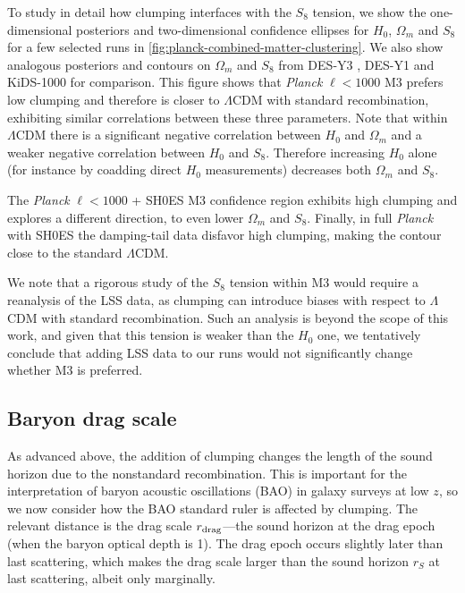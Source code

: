 To study in detail how clumping interfaces with the $S_8$ tension, we show the one-dimensional posteriors and two-dimensional confidence ellipses for $H_0$, $\Omega_m$ and $S_8$ for a few selected runs in \cref{fig:planck-combined-matter-clustering}.
We also show analogous posteriors and contours on $\Omega_m$ and $S_8$ from DES-Y3 \citep{DES-Y3}, DES-Y1 \citep{DES-Y1} and KiDS-1000 \citep{KiDS-1000} for comparison.
This figure shows that {\it Planck} $\ell<1000$ M3 prefers low clumping and therefore is closer to $\Lambda$CDM with standard recombination, exhibiting similar correlations between these three parameters.
Note that within $\Lambda$CDM there is a significant negative correlation between $H_0$ and $\Omega_m$ and a weaker negative correlation between $H_0$ and $S_8$.
Therefore increasing $H_0$ alone (for instance by coadding direct $H_0$ measurements) decreases both $\Omega_m$ and $S_8$.

The {\it Planck} $\ell<1000$ + SH0ES M3 confidence region exhibits high clumping and explores a different direction, to even lower $\Omega_m$ and $S_8$.
Finally, in full {\it Planck} with SH0ES the damping-tail data disfavor high clumping, making the contour close to the standard $\Lambda$CDM.

We note that a rigorous study of the $S_8$ tension within M3 would require a reanalysis of the LSS data, as clumping can introduce biases with respect to $\Lambda$CDM with standard recombination.
Such an analysis is beyond the scope of this work, and given that this tension is weaker than the $H_0$ one, we tentatively conclude that adding LSS data to our runs would not significantly change whether M3 is preferred.

\subsection{Baryon drag scale}

As advanced above, the addition of clumping changes the length of the sound horizon due to the nonstandard recombination.
This is important for the interpretation of baryon acoustic oscillations (BAO) in galaxy surveys at low $z$, so we now consider how the BAO standard ruler is affected by clumping.
The relevant distance is the drag scale $r_{\rm drag}$---the sound horizon at the drag epoch (when the baryon optical depth is 1).
The drag epoch occurs slightly later than last scattering, which makes the drag scale larger than the sound horizon $r_S$ at last scattering, albeit only marginally.

